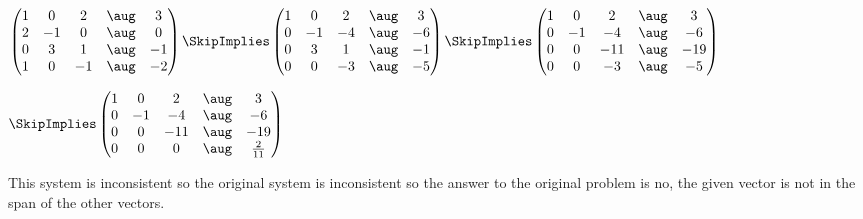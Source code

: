 \documentclass[oneside,12pt]{amsart}
\begin{document}
$
\begin{pmatrix}
1 & 0  & 2  & \aug &   3 \\
2 & -1 & 0  & \aug &   0 \\
0 & 3  & 1  & \aug &  -1 \\
1 & 0  & -1 & \aug &  -2 \\
\end{pmatrix}
\SkipImplies
\begin{pmatrix}
1 & 0 & 2   & \aug & 3 \\
0 & -1 & -4 & \aug & -6 \\
0 & 3 & 1   & \aug & -1 \\
0 & 0 & -3  & \aug & -5
\end{pmatrix}
\SkipImplies
\begin{pmatrix}
1 & 0 & 2   & \aug & 3 \\
0 & -1 & -4 & \aug & -6 \\
0 & 0 & -11 & \aug & -19 \\
0 & 0 & -3  & \aug & -5
\end{pmatrix}
$

$
\SkipImplies
\begin{pmatrix}
1 & 0 & 2   & \aug & 3 \\
0 & -1 & -4 & \aug & -6 \\
0 & 0 & -11 & \aug & -19 \\
0 & 0 & 0   & \aug & \frac{2}{11}
\end{pmatrix}
$

This system is inconsistent so the original system is inconsistent so the answer
to the original problem is no, the given vector is not in the span of the other
vectors.
\end{document}
